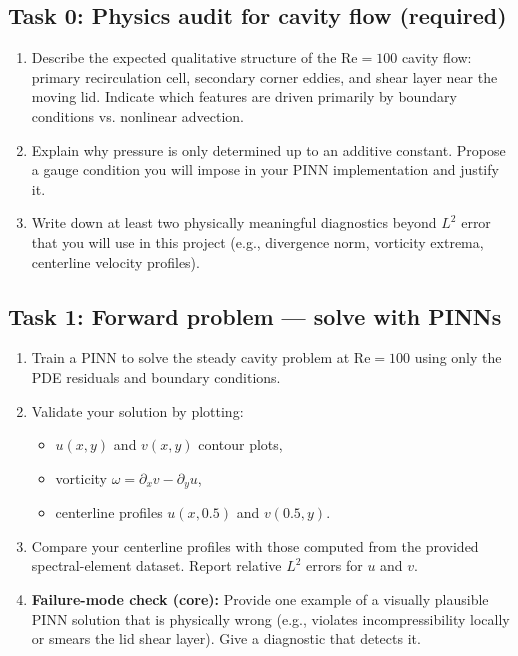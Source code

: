 \documentclass{article}
\begin{document}
\subsection*{Task 0: Physics audit for cavity flow (required)}
\begin{enumerate}
\item Describe the expected qualitative structure of the $\mathrm{Re}=100$ cavity flow: primary recirculation cell, secondary corner eddies, and shear layer near the moving lid. Indicate which features are driven primarily by boundary conditions vs. nonlinear advection.
\item Explain why pressure is only determined up to an additive constant. Propose a gauge condition you will impose in your PINN implementation and justify it.
\item Write down at least two physically meaningful diagnostics beyond $L^2$ error that you will use in this project (e.g., divergence norm, vorticity extrema, centerline velocity profiles).
\end{enumerate}

\subsection*{Task 1: Forward problem --- solve with PINNs}
\begin{enumerate}
\item Train a PINN to solve the steady cavity problem at $\mathrm{Re}=100$ using only the PDE residuals and boundary conditions.
\item Validate your solution by plotting:
\begin{itemize}
\item $u(x,y)$ and $v(x,y)$ contour plots,
\item vorticity $\omega=\partial_x v-\partial_y u$,
\item centerline profiles $u(x,0.5)$ and $v(0.5,y)$.
\end{itemize}
\item Compare your centerline profiles with those computed from the provided spectral-element dataset. Report relative $L^2$ errors for $u$ and $v$.
\item \textbf{Failure-mode check (core):} Provide one example of a visually plausible PINN solution that is physically wrong (e.g., violates incompressibility locally or smears the lid shear layer). Give a diagnostic that detects it.
\end{enumerate}
\end{document}
